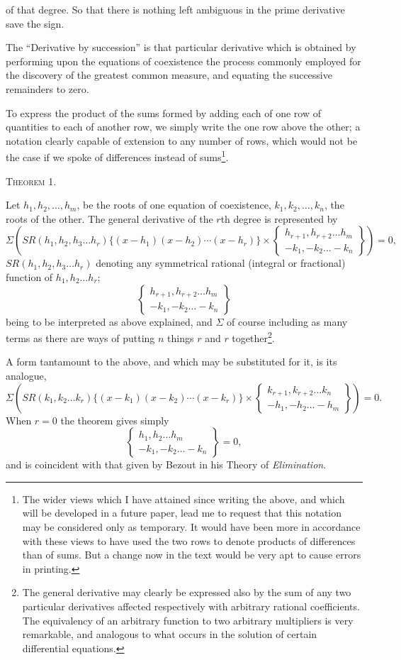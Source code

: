 \documentclass[11pt]{article}
\newcommand{\sourcepage}[1]{\marginpar{\scriptsize p.~#1}}
\newcommand{\theoremhead}[1]{\vspace{0.75em}\begin{center}{\scshape Theorem #1.}\end{center}\vspace{0.15em}}
\newcommand{\SR}{\mathit{SR}}
\newcommand{\rowpair}[2]{\left\{\begin{matrix}#1\\#2\end{matrix}\right\}}
\begin{document}
\sourcepage{41}
of that degree. So that there is nothing left ambiguous in the prime derivative save the sign.

The ``Derivative by succession'' is that particular derivative which is obtained by performing upon the equations of coexistence the process commonly employed for the discovery of the greatest common measure, and equating the successive remainders to zero.

To express the product of the sums formed by adding each of one row of quantities to each of another row, we simply write the one row above the other; a notation clearly capable of extension to any number of rows, which would not be the case if we spoke of differences instead of sums\footnote{The wider views which I have attained since writing the above, and which will be developed in a future paper, lead me to request that this notation may be considered only as temporary. It would have been more in accordance with these views to have used the two rows to denote products of differences than of sums. But a change now in the text would be very apt to cause errors in printing.}.

\theoremhead{1}

Let $h_1,h_2,\ldots,h_m$, be the roots of one equation of coexistence, $k_1,k_2,\ldots,k_n$, the roots of the other. The general derivative of the $r$th degree is represented by
\[
 \Sigma\left(\SR(h_1,h_2,h_3\ldots h_r)\{(x-h_1)(x-h_2)\cdots(x-h_r)\}
 \times \rowpair{h_{r+1},h_{r+2}\ldots h_m}{-k_1,-k_2\ldots -k_n}\right)=0,
\]
$\SR(h_1,h_2,h_3\ldots h_r)$ denoting any symmetrical rational (integral or fractional) function of $h_1,h_2\ldots h_r$;
\[
 \rowpair{h_{r+1},h_{r+2}\ldots h_m}{-k_1,-k_2\ldots -k_n}
\]
being to be interpreted as above explained, and $\Sigma$ of course including as many terms as there are ways of putting $n$ things $r$ and $r$ together\footnote{The general derivative may clearly be expressed also by the sum of any two particular derivatives affected respectively with arbitrary rational coefficients. The equivalency of an arbitrary function to two arbitrary multipliers is very remarkable, and analogous to what occurs in the solution of certain differential equations.}.

A form tantamount to the above, and which may be substituted for it, is its analogue,
\[
 \Sigma\left(\SR(k_1,k_2\ldots k_r)\{(x-k_1)(x-k_2)\cdots(x-k_r)\}
 \times \rowpair{k_{r+1},k_{r+2}\ldots k_n}{-h_1,-h_2\ldots -h_m}\right)=0.
\]
When $r=0$ the theorem gives simply
\[
 \rowpair{h_1,h_2\ldots h_m}{-k_1,-k_2\ldots -k_n}=0,
\]
and is coincident with that given by Bezout in his Theory of \emph{Elimination}.
\end{document}
